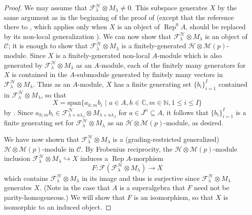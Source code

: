 \documentclass[11pt, reqno]{amsart}
\theoremstyle{definition}\newtheorem{defi}[thm]{Definition}
\theoremstyle{definition}\newtheorem{rem}[thm]{Remark}
\theoremstyle{definition}\newtheorem{exam}[thm]{Example}
\theoremstyle{definition}\newtheorem{assum}[thm]{Assumption}
\newcommand{\cH}{\mathcal{H}}
\newcommand{\cM}{\mathcal{M}}
\newcommand{\cF}{\mathcal{F}}
\newcommand{\cC}{\mathcal{C}}
\newcommand{\CC}{\mathbb{C}}
\newcommand{\NN}{\mathbb{N}}
\DeclareMathOperator{\rep}{Rep}
\newcommand{\repA}{\rep A}
\begin{document}
\begin{proof}
We may assume that $\cF^\cH_\lambda\otimes M_\lambda\neq 0$. This subspace generates $X$ by the same argument as in the beginning of the proof of \cite[Proposition 3.7]{CKLR}  (except that the reference there to \cite[Corollary 4.5.15]{LL}, which applies only when $X$ is an object of $\rep^0A$, should be replaced by its non-local generalization \cite[Lemma 3.73]{CKM-exts}). We can now show that $\cF^\cH_\lambda\otimes M_\lambda$ is an object of $\cC$; it is enough to show that $\cF^\cH_\lambda\otimes M_\lambda$ is a finitely-generated $\cH\otimes\cM(p)$-module. Since $X$ is a finitely-generated non-local $A$-module which is also generated by $\cF^\cH_\lambda\otimes M_\lambda$ as an $A$-module, each of the finitely many generators for $X$ is contained in the $A$-submodule generated by finitely many vectors in $\cF^\cH_\lambda\otimes M_\lambda$. Thus as an $A$-module, $X$ has a finite generating set $\lbrace b_i\rbrace_{i=1}^I$ contained in $\cF^\cH_\lambda\otimes M_\lambda$, so that
\begin{equation*}
X =\mathrm{span}\lbrace a_{h;m} b_i\,\,\vert\,\,a\in A, h\in\CC, m\in\NN, 1\leq i\leq I\rbrace
\end{equation*}
by \cite[Lemma 3.74]{CKM-exts}. Since $a_{h;m} b_i\in\cF^\cH_{\lambda+n\lambda_J}\otimes M_{\lambda+n\lambda_J}$ for $a\in J^n\subseteq A$, it follows that $\lbrace b_i\rbrace_{i=1}^I$ is a finite generating set for $\cF^\cH_\lambda\otimes M_\lambda$ as an $\cH\otimes\cM(p)$-module, as desired.


We have now shown that $\cF^\cH_\lambda\otimes M_\lambda$ is a (grading-restricted generalized) $\cH\otimes\cM(p)$-module in $\cC$. By Frobenius reciprocity, the $\cH\otimes\cM(p)$-module inclusion $\cF^\cH_\lambda\otimes M_\lambda\hookrightarrow X$ induces a $\repA$-morphism
\begin{equation*}
F: \cF(\cF^\cH_\lambda\otimes M_\lambda)\longrightarrow X
\end{equation*}
which contains $\cF^\cH_\lambda\otimes M_\lambda$ in its image and thus is surjective since $\cF^\cH_\lambda\otimes M_\lambda$ generates $X$. (Note in the case that $A$ is a superalgebra that $F$ need not be parity-homogeneous.) We will show that $F$ is an isomorphism, so that $X$ is isomorphic to an induced object.


\end{proof}
\end{document}
